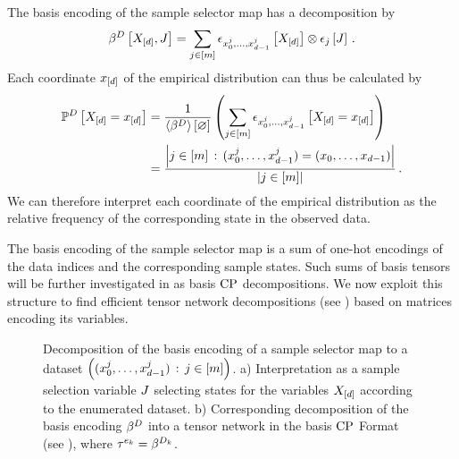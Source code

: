 The basis encoding of the sample selector map has a decomposition by
\begin{align*}
    \beta^{D}\left[X_{[d]},J\right]
    = \sum_{j\in[m]} \epsilon_{{x_{0}^{j},\ldots,x_{d-1}^{j}}}\left[X_{[d]}\right] \otimes \epsilon_{j}\left[J\right] \, .
\end{align*}
Each coordinate $x_{[d]}$ of the empirical distribution can thus be calculated by
\begin{align*}
    \mathbb{P}^{D}\left[X_{[d]}=x_{[d]}\right]
    & = \frac{1}{\left\langle \beta^{D}\right\rangle \left[ \varnothing \right]} \left( \sum_{j\in[m]} \epsilon_{{x_{0}^{j},\ldots,x_{d-1}^{j}}}\left[X_{[d]}=x_{[d]}\right]  \right) \\
    &= \frac{\left|j\in[m] \, : \, ({x_{0}^{j},\ldots,x_{d-1}^{j}}) = (x_{0},\ldots,x_{d-1})\right|}{\left|j\in[m]\right|} \, .
\end{align*}
We can therefore interpret each coordinate of the empirical distribution as the relative frequency of the corresponding state in the observed data.

The basis encoding of the sample selector map is a sum of one-hot encodings of the data indices and the corresponding sample states.
Such sums of basis tensors will be further investigated in  as basis $\mathrm{CP}$ decompositions.
We now exploit this structure to find efficient tensor network decompositions (see ) based on matrices encoding its variables.


\begin{figure}[t!]
    \begin{center}
        
    \end{center}
    \caption{
        Decomposition of the basis encoding of a sample selector map to a dataset $\left(({x_{0}^{j},\ldots,x_{d-1}^{j}})\,:\,j\in[m]\right)$.
        a) Interpretation as a sample selection variable $J$ selecting states for the variables $X_{[d]}$ according to the enumerated dataset.
        b) Corresponding decomposition of the basis encoding $\beta^{D}$ into a tensor network in the basis $\mathrm{CP}$ Format (see ), where $\tau^{e_{k}}=\beta^{D_{k}}$.
    }
    \label{fig:DataDecomposition}
\end{figure}


